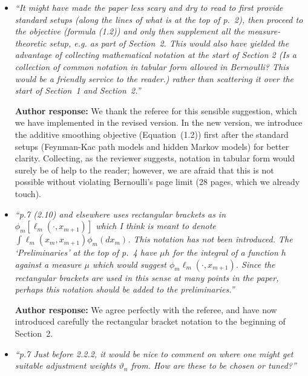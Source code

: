\documentclass[11pt]{amsart}
\begin{document}
\begin{itemize}
\item {\em ``It might have made the paper less scary and dry to read to first provide standard setups (along the lines of what is at the top of p.~2), then proceed to the objective (formula (1.2)) and only then supplement all the measure-theoretic setup, e.g. as part of Section~2. This would also have yielded the advantage of collecting mathematical notation at the start of Section 2 (Is a collection of common notation in tabular form allowed in Bernoulli? This would be a friendly service to the reader.) rather than scattering it over the start of Section~1 and Section~2.''} \medskip

\textbf{Author response:} We thank the referee for this sensible suggestion, which we have implemented in the revised version. In the new version, we introduce the additive smoothing objective (Equation~(1.2)) first after the standard setups (Feynman-Kac path models and hidden Markov models) for better clarity. Collecting, as the reviewer suggests, notation in tabular form would surely be of help to the reader; however, we are afraid that this is not possible without violating Bernoulli's page limit (28 pages, which we already touch).\medskip 

\item {\em ``p.7 (2.10) and elsewhere uses rectangular brackets as in $\phi_m[\ell_m(\cdot,x_{m+1})]$ which I think is meant to denote $\int \ell_m(x_m,x_{m+1})\phi_m(dx_m)$. This notation has not been introduced. The `Preliminaries' at the top of p.~4 have $\mu h$ for the integral of a function $h$ against a measure $\mu$ which would suggest $\phi_m \ell_m(\cdot, x_{m+1})$. Since the rectangular brackets are used in this sense at many points in the paper, perhaps this notation should be added to the preliminaries.''} \medskip

\textbf{Author response:} We agree perfectly with the referee, and have now introduced carefully the rectangular bracket notation to the beginning of Section~2. \medskip

\item {\em ``p.7 Just before 2.2.2, it would be nice to comment on where one might get suitable adjustment weights $\vartheta_n$ from. How are these to be chosen or tuned?''} \medskip


\end{itemize}
\end{document}
